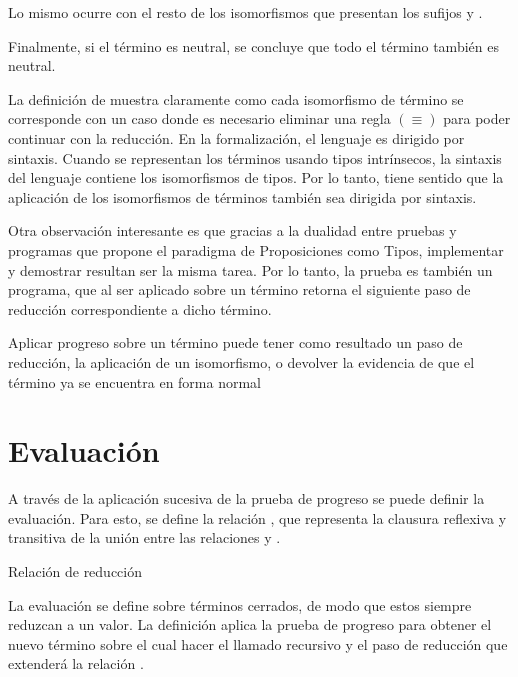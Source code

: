 
Lo mismo ocurre con el resto de los isomorfismos que presentan los sufijos  y \const{$\eta$}.

Finalmente, si el término  es neutral, se concluye que todo el término también es neutral.

La definición de  muestra claramente como cada isomorfismo de término se corresponde con un caso donde es necesario eliminar una regla $(\equiv)$ para poder continuar con la reducción.
En la formalización, el lenguaje es dirigido por sintaxis.
Cuando se representan los términos usando tipos intrínsecos, la sintaxis del lenguaje contiene los isomorfismos de tipos.
Por lo tanto, tiene sentido que la aplicación de los isomorfismos de términos también sea dirigida por sintaxis.

Otra observación interesante es que gracias a la dualidad entre pruebas y programas que propone el paradigma de Proposiciones como Tipos, implementar y demostrar resultan ser la misma tarea.
Por lo tanto, la prueba  es también un programa, que al ser aplicado sobre un término retorna el siguiente paso de reducción correspondiente a dicho término.

\begin{example}
	Aplicar progreso sobre un término puede tener como resultado un paso de reducción, la aplicación de un isomorfismo, o devolver la evidencia de que el término ya se encuentra en forma normal
\end{example}

\section{Evaluación}

A través de la aplicación sucesiva de la prueba de progreso se puede definir la evaluación.
Para esto, se define la relación \type{$\_\rightsquigarrow\_$}, que representa la clausura reflexiva y transitiva de la unión entre las relaciones \type{$\_\hookrightarrow\_$} y \type{$\_\rightleftarrows\_$}.

\begin{codigo}
	Relación de reducción
\end{codigo}

La evaluación se define sobre términos cerrados, de modo que estos siempre reduzcan a un valor.
La definición aplica la prueba de progreso para obtener el nuevo término sobre el cual hacer el llamado recursivo y el paso de reducción que extenderá la relación \type{$\_\rightsquigarrow\_$}.

